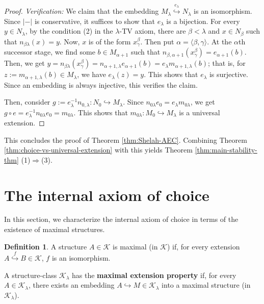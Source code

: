 \documentclass[10pt]{amsart}
\numberwithin{equation}{section}
\theoremstyle{plain}
\theoremstyle{definition}
\newtheorem{definition}[theorem]{Definition}
\newtheorem*{remark}{Remark}
\newcommand{\K}{\mathcal{K}}
\newcommand{\pair}[1]{\langle #1 \rangle}
\newcommand{\embed}{\hookrightarrow}
\newcommand{\embedge}[1]{\overset{#1}{\embed}}
\begin{document}
\begin{proof}
\medskip
\noindent
{\em Verification:}
We claim that the embedding $M_\lambda\embedge{e_\lambda}N_\lambda$ is an isomorphism.
Since $|-|$ is conservative, it suffices to show that $e_\lambda$ is a bijection.
For every $y\in N_\lambda$, by the condition (2) in the $\lambda$-TV axiom, there are $\beta<\lambda$ and $x\in N_\beta$ such that $n_{\beta\lambda}(x)=y$.
Now, $x$ is of the form $x^\beta_\gamma$.
Then put $\alpha=\pair{\beta,\gamma}$.
At the $\alpha$th successor stage, we find some $b\in M_{\alpha+1}$ such that $n_{\beta,\alpha+1}(x^\beta_\gamma)=e_{\alpha+1}(b)$.
Then, we get $y=n_{\beta\lambda}(x^\beta_\gamma)=n_{\alpha+1,\lambda}e_{\alpha+1}(b)=e_\lambda m_{\alpha+1,\lambda}(b)$; that is, for $z:=m_{\alpha+1,\lambda}(b)\in M_\lambda$, we have  $e_\lambda(z)=y$.
This shows that $e_\lambda$ is surjective.
Since an embedding is always injective, this verifies the claim.

Then, consider $g:=e^{-1}_\lambda n_{0,\lambda}\colon N_0\embed M_\lambda$.
Since $n_{0\lambda}e_0=e_\lambda m_{0\lambda}$, we get 
$g\circ e=e^{-1}_\lambda n_{0\lambda} e_0=m_{0\lambda}$.
This shows that $m_{0\lambda}\colon M_0\embed M_\lambda$ is a universal extension.
\end{proof}

This concludes the proof of Theorem \ref{thm:Shelah-AEC}.
Combining Theorem \ref{thm:choice-vs-universal-extension} with this yields Theorem \ref{thm:main-stability-thm} (1)$\Rightarrow$(3).



\section{The internal axiom of choice}\label{sec:IAC-structure}

In this section, we characterize the internal axiom of choice in terms of the existence of maximal structures.

\begin{definition}
A structure $A\in\K$ is maximal (in $\K$) if, for every extension $A\embedge{f}B\in\K$, $f$ is an isomorphism.

A structure-class $\K_\lambda$ has the {\bf maximal extension property} if, for every $A\in\K_\lambda$, there exists an embedding $A\embed M\in\K_\lambda$ into a maximal structure (in $\K_\lambda$).
\end{definition}
\end{document}
